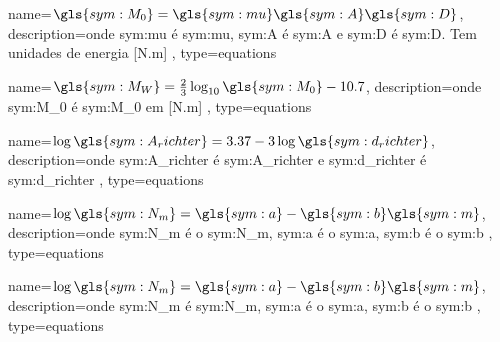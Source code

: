 
{
	name={\ensuremath{\gls{sym:M_0} = \gls{sym:mu}\gls{sym:A}\gls{sym:D}}},
	description={onde \gls{sym:mu} é \glsdesc{sym:mu}, 
				 \gls{sym:A} é \glsdesc{sym:A} e 
				 \gls{sym:D} é \glsdesc{sym:D}. 
				 Tem unidades de energia [N.m]
		 },
	type=equations
}

{
	name={\ensuremath{\gls{sym:M_W} = \frac{2}{3} \log_{10}{\gls{sym:M_0}} - 10.7 }},
	description={onde \gls{sym:M_0} é \glsdesc{sym:M_0} em [N.m]
		 },
	type=equations
}

{
	name={\ensuremath{\log{\gls{sym:A_richter}} = 3.37 - 3\log{\gls{sym:d_richter}}}},
	description={onde \gls{sym:A_richter} é \glsdesc{sym:A_richter} e 
					  \gls{sym:d_richter} é \glsdesc{sym:d_richter}
		 },
	type=equations
}

{
	name={\ensuremath{\log{\gls{sym:N_m}}  = \gls{sym:a} - \gls{sym:b}\gls{sym:m} }},
	description={onde \gls{sym:N_m} é o \glsdesc{sym:N_m}, 
					  \gls{sym:a} é o \glsdesc{sym:a},
					  \gls{sym:b} é o \glsdesc{sym:b}
    },
	type=equations
}


{
	name={\ensuremath{\log{\gls{sym:N_m}}  = \gls{sym:a} - \gls{sym:b}\gls{sym:m} }},
	description={onde \gls{sym:N_m} é \glsdesc{sym:N_m}, 
					  \gls{sym:a} é o \glsdesc{sym:a},
					  \gls{sym:b} é o \glsdesc{sym:b}
    },
	type=equations
}
